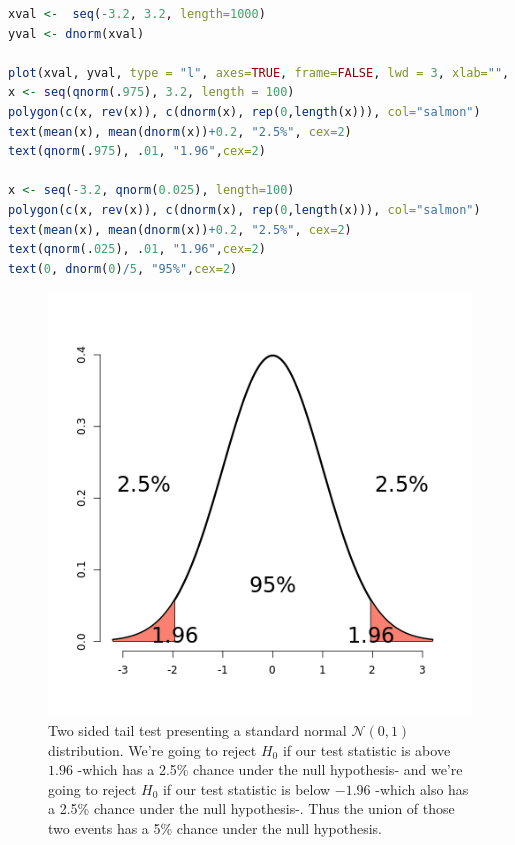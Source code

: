 \documentclass{homework}
\begin{document}
\begin{lstlisting}[language=R]
xval <-  seq(-3.2, 3.2, length=1000)
yval <- dnorm(xval)

plot(xval, yval, type = "l", axes=TRUE, frame=FALSE, lwd = 3, xlab="", ylab= "")
x <- seq(qnorm(.975), 3.2, length = 100)
polygon(c(x, rev(x)), c(dnorm(x), rep(0,length(x))), col="salmon")
text(mean(x), mean(dnorm(x))+0.2, "2.5%", cex=2)
text(qnorm(.975), .01, "1.96",cex=2)

x <- seq(-3.2, qnorm(0.025), length=100)
polygon(c(x, rev(x)), c(dnorm(x), rep(0,length(x))), col="salmon")
text(mean(x), mean(dnorm(x))+0.2, "2.5%", cex=2)
text(qnorm(.025), .01, "1.96",cex=2)
text(0, dnorm(0)/5, "95%",cex=2)
\end{lstlisting}

\begin{figure}
    \centering
    \includegraphics[scale = 0.4]{figs/two sided tail test.png}
    \caption{Two sided tail test presenting a standard normal $\mathcal{N}(0,1)$ distribution. We're going to reject $H_0$ if our test statistic is above $1.96$ -which has a 2.5\% chance under the null hypothesis- and we're going to reject $H_0$ if our test statistic is below $-1.96$ -which also has a 2.5\% chance under the null hypothesis-. Thus the union of those two events has a 5\% chance under the null hypothesis. }
    \label{fig:my_label}
\end{figure}
\end{document}
